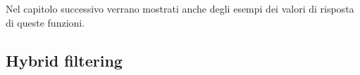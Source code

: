 
Nel capitolo successivo verrano mostrati anche degli esempi dei valori di risposta di queste funzioni.

\subsection{Hybrid filtering} 

\lstset{style=python_code_style}
\label{lst:CF_Hybrid}
